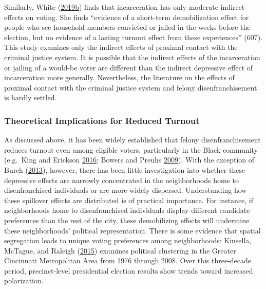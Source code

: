 \documentclass[
  12pt,
]{article}
\begin{document}
Similarly, White (\protect\hyperlink{ref-White2019a}{2019}\protect\hyperlink{ref-White2019a}{b}) finds that incarceration has only moderate indirect effects on voting. She finds ``evidence of a short-term demobilization effect for people who see household members convicted or jailed in the weeks before the election, but no evidence of a lasting turnout effect from these experiences'' (607). This study examines only the indirect effects of proximal contact with the criminal justice system. It is possible that the indirect effects of the incarceration or jailing of a would-be voter are different than the indirect depressive effect of incarceration more generally. Nevertheless, the literature on the effects of proximal contact with the criminal justice system and felony disenfranchisement is hardly settled.

\hypertarget{theoretical-implications-for-reduced-turnout}{%
\subsubsection*{Theoretical Implications for Reduced Turnout}\label{theoretical-implications-for-reduced-turnout}}

As discussed above, it has been widely established that felony disenfranchisement reduces turnout even among eligible voters, particularly in the Black community (e.g.~King and Erickson \protect\hyperlink{ref-King2016}{2016}; Bowers and Preuhs \protect\hyperlink{ref-Bowers2009}{2009}). With the exception of Burch (\protect\hyperlink{ref-Burch2013}{2013}), however, there has been little investigation into whether these depressive effects are narrowly concentrated in the neighborhoods home to disenfranchised individuals or are more widely dispersed. Understanding how these spillover effects are distributed is of practical importance. For instance, if neighborhoods home to disenfranchised individuals display different candidate preferences than the rest of the city, these demobilizing effects will undermine these neighborhoods' political representation. There is some evidence that spatial segregation leads to unique voting preferences among neighborhoods: Kinsella, McTague, and Raleigh (\protect\hyperlink{ref-Kinsella2015}{2015}) examines political clustering in the Greater Cincinnati Metropolitan Area from 1976 through 2008. Over this three-decade period, precinct-level presidential election results show trends toward increased polarization.
\end{document}
